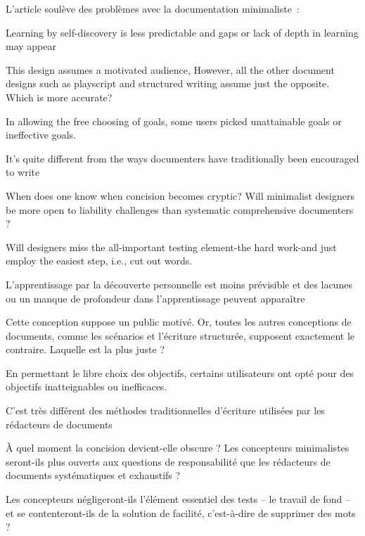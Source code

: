 {L'article soulève des problèmes avec la documentation minimaliste~:
\quoteenfrlist
{
\item Learning by self-discovery is less predictable and gaps or lack of depth in learning may appear \elide
\item This design assumes a motivated audience, However, all the other document designs such as  playscript and structured writing assume just the opposite. Which is more accurate?
\item In allowing the free choosing of goals, some users picked unattainable goals or ineffective goals.
\item It’s quite different from the ways documenters have traditionally been encouraged to write \elide
\item When does one know when concision becomes cryptic? Will minimalist designers be more open to liability challenges than systematic comprehensive documenters ?
\item Will designers miss the all-important testing element-the hard work-and just employ the easiest  step, i.e., cut out words.
}
{
\item L’apprentissage par la découverte personnelle est moins prévisible et des lacunes ou un manque de profondeur dans l’apprentissage peuvent apparaître \elide
\item Cette conception suppose un public motivé. Or, toutes les autres conceptions de documents, comme les scénarios et l’écriture structurée, supposent exactement le contraire. Laquelle est la plus juste ?
\item En permettant le libre choix des objectifs, certains utilisateurs ont opté pour des objectifs inatteignables ou inefficaces.
\item C’est très différent des méthodes traditionnelles d’écriture utilisées par les rédacteurs de documents \elide
\item À quel moment la concision devient-elle obscure ? Les concepteurs minimalistes seront-ils plus ouverts aux questions de responsabilité que les rédacteurs de documents systématiques et exhaustifs ?
\item Les concepteurs négligeront-ils l’élément essentiel des tests – le travail de fond – et se contenteront-ils de la solution de facilité, c’est-à-dire de supprimer des mots ?
}
{\cite{brockmann_min_1990}}
\vspace{-1\baselineskip}
}{}


